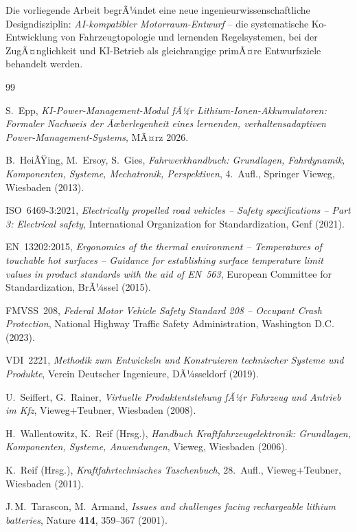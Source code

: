 ﻿\documentclass[12pt,a4paper]{article}
\begin{document}
Die vorliegende Arbeit begrÃ¼ndet eine neue ingenieurwissenschaftliche Designdisziplin:
\textit{AI-kompatibler Motorraum-Entwurf} -- die systematische Ko-Entwicklung
von Fahrzeugtopologie und lernenden Regelsystemen, bei der ZugÃ¤nglichkeit und
KI-Betrieb als gleichrangige primÃ¤re Entwurfsziele behandelt werden.

\newpage
\begin{thebibliography}{99}

	S.\ Epp,
	\textit{KI-Power-Management-Modul fÃ¼r Lithium-Ionen-Akkumulatoren:
		Formaler Nachweis der Ãœberlegenheit eines lernenden,
		verhaltensadaptiven Power-Management-Systems}, MÃ¤rz 2026.

	B.\ HeiÃŸing, M.\ Ersoy, S.\ Gies,
	\textit{Fahrwerkhandbuch: Grundlagen, Fahrdynamik, Komponenten,
		Systeme, Mechatronik, Perspektiven},
	4.\ Aufl., Springer Vieweg, Wiesbaden (2013).

	ISO~6469-3:2021,
	\textit{Electrically propelled road vehicles -- Safety specifications --
		Part 3: Electrical safety},
	International Organization for Standardization, Genf (2021).

	EN~13202:2015,
	\textit{Ergonomics of the thermal environment -- Temperatures of touchable
		hot surfaces -- Guidance for establishing surface temperature limit values
		in product standards with the aid of EN~563},
	European Committee for Standardization, BrÃ¼ssel (2015).

	FMVSS~208,
	\textit{Federal Motor Vehicle Safety Standard 208 -- Occupant Crash Protection},
	National Highway Traffic Safety Administration, Washington D.C. (2023).

	VDI~2221,
	\textit{Methodik zum Entwickeln und Konstruieren technischer Systeme
		und Produkte},
	Verein Deutscher Ingenieure, DÃ¼sseldorf (2019).

	U.\ Seiffert, G.\ Rainer,
	\textit{Virtuelle Produktentstehung fÃ¼r Fahrzeug und Antrieb im Kfz},
	Vieweg+Teubner, Wiesbaden (2008).

	H.\ Wallentowitz, K.\ Reif (Hrsg.),
	\textit{Handbuch Kraftfahrzeugelektronik: Grundlagen, Komponenten, Systeme,
		Anwendungen},
	Vieweg, Wiesbaden (2006).

	K.\ Reif (Hrsg.),
	\textit{Kraftfahrtechnisches Taschenbuch},
	28.\ Aufl., Vieweg+Teubner, Wiesbaden (2011).

	J.\,M.\ Tarascon, M.\ Armand,
	\textit{Issues and challenges facing rechargeable lithium batteries},
	Nature \textbf{414}, 359--367 (2001).

\end{thebibliography}
\end{document}
